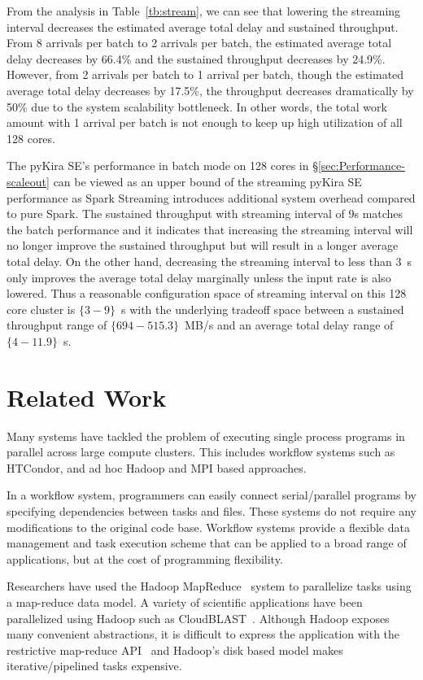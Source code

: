 \documentclass[10pt,journal,compsoc]{IEEEtran}
\begin{document}
From the analysis in Table~\ref{tb:stream}, we can see that lowering the streaming interval decreases
the estimated average total delay and sustained throughput.
From 8 arrivals per batch to 2 arrivals per batch, the estimated average total delay decreases by 66.4\%
and the sustained throughput decreases by 24.9\%. 
However, from 2 arrivals per batch to 1 arrival per batch, though the estimated average total delay decreases by 17.5\%,
the throughput decreases dramatically by 50\% due to the system scalability bottleneck.
In other words, the total work amount with 1 arrival per batch is not enough to keep up high utilization
of all 128 cores. 

The pyKira SE's performance in batch mode on 128 cores in \S\ref{sec:Performance-scaleout} 
can be viewed as an upper bound of the streaming pyKira SE performance as Spark Streaming
introduces additional system overhead compared to pure Spark.
The sustained throughput with streaming interval of 9s matches the batch performance and
it indicates that increasing the streaming interval will no longer improve the sustained throughput 
but will result in a longer average total delay.
On the other hand, decreasing the streaming interval to less than 3~s only improves the average total delay
marginally unless the input rate is also lowered.
Thus a reasonable configuration space of streaming interval on this 128 core cluster is $\{3-9\}$~s with the underlying tradeoff
space between a sustained throughput range of $\{694-515.3\}$~MB/s and 
an average total delay range of $\{4-11.9\}$~s.


\section{Related Work}
\label{sec:Related}

Many systems have tackled the problem of executing single process programs in parallel
across large compute clusters. This includes workflow systems such as HTCondor,
and ad hoc Hadoop and MPI based approaches.

In a workflow system, programmers can easily connect serial/parallel programs by specifying
dependencies between tasks and files. These systems do not require any modifications to
the original code base. Workflow systems provide a flexible data management and task execution
scheme that can be applied to a broad range of applications, but at the cost of programming
flexibility.

Researchers have used the Hadoop MapReduce~\cite{HADOOP} system to parallelize
tasks using a map-reduce data model. A variety of scientific applications have been parallelized
using Hadoop such as CloudBLAST~\cite{matsunaga08}. 
Although Hadoop exposes many convenient abstractions, it is difficult to express the application 
with the restrictive map-reduce API~\cite{dewitt08} and Hadoop's disk based model makes 
iterative/pipelined tasks expensive.
\end{document}
